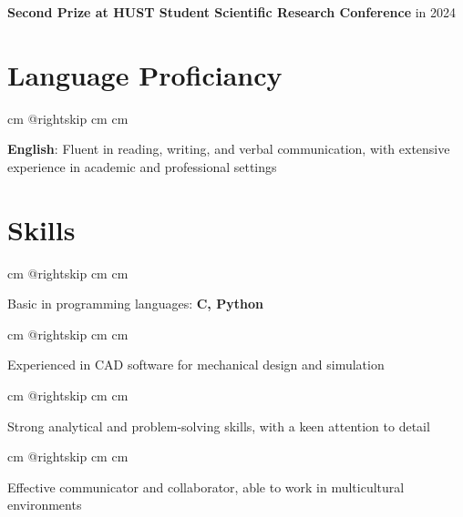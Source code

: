 \documentclass[10pt, letterpaper]{article}
\begin{document}
        \textbf{Second Prize at HUST Student Scientific Research Conference } in 2024 \par\endgroup
    \newpage %

    \section{Language Proficiancy}

        \begingroup{} cm
        \advance\csname @rightskip cm
        \advance{} cm

        \textbf{English}: Fluent in reading, writing, and verbal communication, with extensive experience in academic and professional settings \par\endgroup

        \vspace{0.2 cm}

    
    \section{Skills}

        \begingroup{} cm
        \advance\csname @rightskip cm
        \advance{} cm

         Basic in programming languages: \textbf{C, Python} \par\endgroup

        \vspace{0.2 cm}
        \begingroup{} cm
        \advance\csname @rightskip cm
        \advance{} cm

        Experienced in CAD software for mechanical design and simulation \par\endgroup

        \vspace{0.2 cm}
        \begingroup{} cm
        \advance\csname @rightskip cm
        \advance{} cm

        Strong analytical and problem-solving skills, with a keen attention to detail \par\endgroup

        \vspace{0.2 cm}
        \begingroup{} cm
        \advance\csname @rightskip cm
        \advance{} cm

        Effective communicator and collaborator, able to work in multicultural environments \par\endgroup
\end{document}
